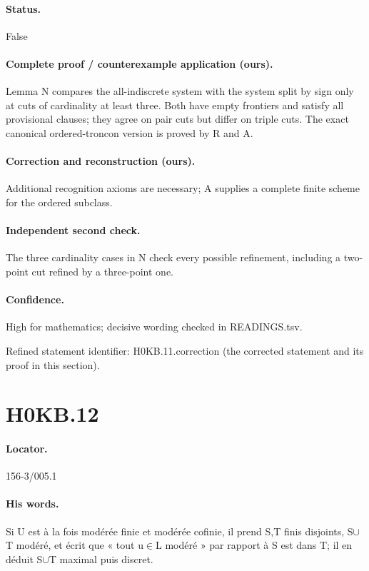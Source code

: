 \paragraph{Status.} False

\paragraph{Complete proof / counterexample application (ours).} Lemma N compares the all-indiscrete system with the system split by sign only at cuts of cardinality at least three. Both have empty frontiers and satisfy all provisional clauses; they agree on pair cuts but differ on triple cuts. The exact canonical ordered-troncon version is proved by R and A.

\paragraph{Correction and reconstruction (ours).} Additional recognition axioms are necessary; A supplies a complete finite scheme for the ordered subclass.

\paragraph{Independent second check.} The three cardinality cases in N check every possible refinement, including a two-point cut refined by a three-point one.

\paragraph{Confidence.} High for mathematics; decisive wording checked in READINGS.tsv.

\noindent Refined statement identifier: H0KB.11.correction (the corrected statement and its proof in this section).

\section*{H0KB.12}\label{statement:H0KB.12}
\paragraph{Locator.} 156-3/005.1

\paragraph{His words.} Si U est à la fois modérée finie et modérée cofinie, il prend S,T finis disjoints, S\ensuremath{\cup}T modéré, et écrit que « tout u\ensuremath{\in}L modéré » par rapport à S est dans T; il en déduit S\ensuremath{\cup}T maximal puis discret.


